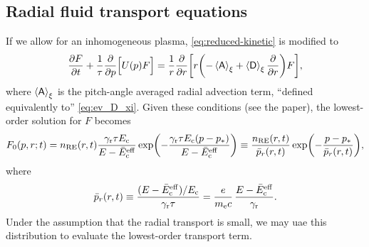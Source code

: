 \documentclass[11pt,a4paper,english
]{article}
\newcommand{\ee}{\mathrm{e}}
\newcommand{\nRE}{\ensuremath{n_{\rm RE}}}
\begin{document}
\subsection{Radial fluid transport equations}
If we allow for an inhomogeneous plasma, \eqref{eq:reduced-kinetic} is
modified to
\begin{equation}\label{eq:reduced-kinetic_VD}
\pdv{F}{t}+\frac{1}{\tau}\pdv{p}\qty[\Big.U(p)F]
=\frac{1}{r}\pdv{r}\qty[r\qty(-\ev{\mathsf{A}}_\xi+\ev{\mathsf{D}}_\xi\pdv{r})F],
\end{equation}
where $\ev{\mathsf{A}}_\xi$ is the pitch-angle averaged radial
advection term, ``defined equivalently to'' \eqref{eq:ev_D_xi}. Given
these conditions (see the paper), the lowest-order solution for $F$
becomes
\begin{equation}
F_0(p,r;t) = \nRE(r,t)
\frac{\gamma_{\rm r}\tau E_{\rm c}}{E-\bar{E}_{\rm c}^{\rm eff}}
\exp(-\frac{\gamma_{\rm r}\tau E_{\rm c}(p-p_{*})}{E-\bar{E}_{\rm c}^{\rm eff}})
\equiv \frac{\nRE(r,t)}{\bar{p}_r(r,t)}\exp(-\frac{p-p_{*}}{\bar{p}_r(r,t)}),
\end{equation}
where %
\begin{equation}
\bar{p}_r(r,t)\equiv\frac{(E-\bar{E}_{\rm c}^{\rm eff})/E_{\rm c}}
{\gamma_{\rm r}\tau}
=\frac{e}{m_{\ee}c}\,\frac{E-\bar{E}_{\rm c}^{\rm eff}}
{\gamma_{\rm r}}.
\end{equation}
Under the assumption that the radial transport is small, we may uae
this distribution to evaluate the lowest-order transport term.
\end{document}
